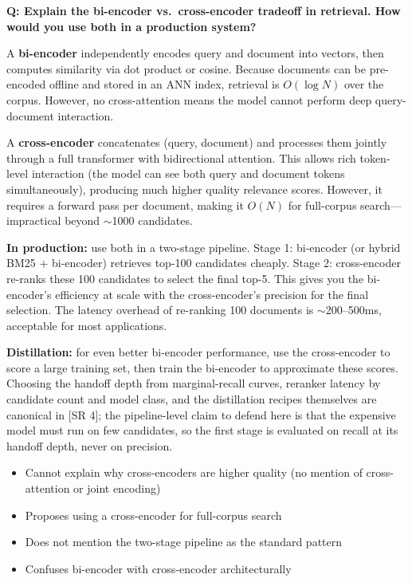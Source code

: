 \begin{interviewq}
\textbf{Q: Explain the bi-encoder vs.\ cross-encoder tradeoff in retrieval.
How would you use both in a production system?}

 \quad {} \quad \badgefreq{\freqhigh}

\stronganswer
A \textbf{bi-encoder} independently encodes query and document into vectors,
then computes similarity via dot product or cosine.  Because documents can be
pre-encoded offline and stored in an ANN index, retrieval is $O(\log N)$ over
the corpus.  However, no cross-attention means the model cannot perform deep
query-document interaction.

A \textbf{cross-encoder} concatenates (query, document) and processes them
jointly through a full transformer with bidirectional attention.  This allows
rich token-level interaction (the model can see both query and document tokens
simultaneously), producing much higher quality relevance scores.  However,
it requires a forward pass per document, making it $O(N)$ for full-corpus
search---impractical beyond $\sim$1000 candidates.

\textbf{In production:} use both in a two-stage pipeline.  Stage 1: bi-encoder
(or hybrid BM25 + bi-encoder) retrieves top-100 candidates cheaply.  Stage 2:
cross-encoder re-ranks these 100 candidates to select the final top-5.  This
gives you the bi-encoder's efficiency at scale with the cross-encoder's
precision for the final selection.  The latency overhead of re-ranking 100
documents is $\sim$200--500ms, acceptable for most applications.

\textbf{Distillation:} for even better bi-encoder performance, use the
cross-encoder to score a large training set, then train the bi-encoder to
approximate these scores.  Choosing the handoff depth from marginal-recall
curves, reranker latency by candidate count and model class, and the
distillation recipes themselves are canonical in [SR 4]; the pipeline-level
claim to defend here is that the expensive model must run on few candidates,
so the first stage is evaluated on recall at its handoff depth, never on
precision.

\redflags
\begin{itemize}
    \item Cannot explain why cross-encoders are higher quality (no mention
          of cross-attention or joint encoding)
    \item Proposes using a cross-encoder for full-corpus search
    \item Does not mention the two-stage pipeline as the standard pattern
    \item Confuses bi-encoder with cross-encoder architecturally
\end{itemize}


\end{interviewq}
